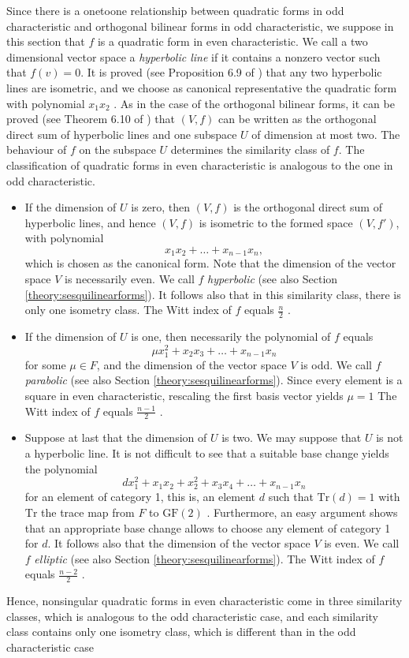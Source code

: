 \documentclass[a4paper,11pt]{report}
\begin{document}
{{Since there is a one\texttt{}to\texttt{}one relationship
between quadratic forms in odd characteristic and orthogonal bilinear forms in
odd characteristic, we suppose in this section that $f$ is a quadratic form in even characteristic. We call a two dimensional vector
space a \emph{hyperbolic line} if it contains a non\texttt{}zero vector such that $f(v) = 0$. It is proved (see Proposition 6.9 of \cite{Cameron}) that any two hyperbolic lines are isometric, and we choose as canonical
representative the quadratic form with polynomial $x_1 x_2$ . As in the case of the orthogonal bilinear forms, it can be proved (see
Theorem 6.10 of \cite{Cameron}) that $(V,f)$ can be written as the orthogonal direct sum of hyperbolic lines and one
subspace $U$ of dimension at most two. The behaviour of $f$ on the subspace $U$ determines the similarity class of $f$. The classification of quadratic forms in even characteristic is analogous to
the one in odd characteristic. 
\begin{itemize}
\item If the dimension of $U$ is zero, then $(V,f)$ is the orthogonal direct sum of hyperbolic lines, and hence $(V,f)$ is isometric to the formed space $(V,f')$, with polynomial 
\[x_1 x_2 + \ldots + x_{n-1}x_n,\]
  which is chosen as the canonical form. Note that the dimension of the vector
space $V$ is necessarily even. We call $f$ \emph{hyperbolic} (see also Section \ref{theory:sesquilinearforms}). It follows also that in this similarity class, there is only one isometry
class. The Witt index of $f$ equals $\frac{n}{2}$ . 
\item If the dimension of $U$ is one, then necessarily the polynomial of $f$ equals 
\[ \mu x_1^2 + x_2 x_3 + \ldots + x_{n-1}x_n \]
  for some $\mu \in F$, and the dimension of the vector space $V$ is odd. We call $f$ \emph{parabolic} (see also Section \ref{theory:sesquilinearforms}). Since every element is a square in even characteristic, rescaling the first
basis vector yields $\mu=1$ The Witt index of $f$ equals $\frac{n-1}{2}$ . 
\item  Suppose at last that the dimension of $U$ is two. We may suppose that $U$ is not a hyperbolic line. It is not difficult to see that a suitable base
change yields the polynomial 
\[ d x_1^2 + x_1x_2 + x_2^2 + x_3 x_4 + \ldots + x_{n-1}x_n \]
 for an element of category 1, this is, an element $d$ such that  $\mathrm{Tr}(d)=1$  with $\mathrm{Tr}$  the trace map from $F$ to $\mathrm{GF}(2)$ . Furthermore, an easy argument shows that an appropriate base change allows
to choose any element of category 1 for $d$. It follows also that the dimension of the vector space $V$ is even. We call $f$ \emph{elliptic} (see also Section \ref{theory:sesquilinearforms}). The Witt index of $f$ equals $\frac{n-2}{2}$ . 
\end{itemize}
 Hence, non\texttt{}singular quadratic forms in even characteristic
come in three similarity classes, which is analogous to the odd characteristic
case, and each similarity class contains only one isometry class, which is
different than in the odd characteristic case 

}}
\end{document}
